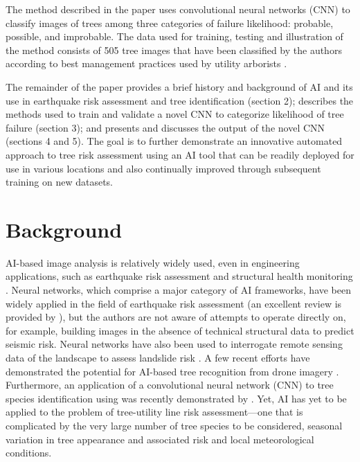 \documentclass[Journal,letterpaper, SingleSpace, InsideFigs]{ascelike-new}
\begin{document}
The method described in the paper uses convolutional neural networks (CNN) to classify images of trees among three categories of failure likelihood: probable, possible, and improbable.  The data used for training, testing and illustration of the method consists of 505 tree images that have been classified by the authors according to best management practices used by utility arborists \cite{goodfellow2020best}. 

The remainder of the paper provides a brief history and background of AI and its use in earthquake risk assessment and tree identification (section 2); describes the methods used to train and validate a novel CNN to categorize likelihood of tree failure (section 3); and presents and discusses the output of the novel CNN (sections 4 and 5). The goal is to further demonstrate an innovative automated approach to tree risk assessment using an AI tool that can be readily deployed for use in various locations and also continually improved through subsequent training on new datasets.



\section{Background}

AI-based image analysis is relatively widely used, even in engineering applications, such as earthquake risk assessment \cite{jiao2020artificial,salehi2018emerging} and structural health monitoring \cite{spencer2019advances,wang2019novel}. Neural networks, which comprise a major category of AI frameworks, have been widely applied in the field of earthquake risk assessment (an excellent review is provided by ), but the authors are not aware of attempts to operate directly on, for example, building images in the absence of technical structural data to predict seismic risk.  Neural networks have also been used to interrogate remote sensing data of the landscape to assess landslide risk \cite{su2020deep}.
A few recent efforts have demonstrated the potential for AI-based tree recognition from drone imagery \cite{santos2019assessment, egli2020cnnbased}. Furthermore, an application of a convolutional neural network (CNN) to tree species identification using was recently demonstrated by . 
Yet, AI has yet to be applied to the problem of tree-utility line risk assessment---one that is complicated by the very large number of tree species to be considered, seasonal variation in tree appearance and associated risk and local meteorological conditions. 
\end{document}
